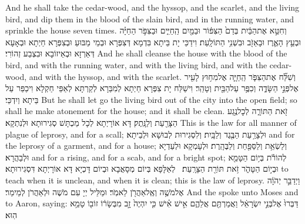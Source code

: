 {And he shall take the cedar-wood, and the hyssop, and the scarlet, and the living bird, and dip them in the blood of the slain bird, and in the running water, and sprinkle the house seven times.}{}
{וְחִטֵּ֣א אֶת\maqqaf הַבַּ֔יִת בְּדַם֙ הַצִּפּ֔וֹר וּבַמַּ֖יִם הַֽחַיִּ֑ים וּבַצִּפֹּ֣ר הַחַיָּ֗ה וּבְעֵ֥ץ הָאֶ֛רֶז וּבָאֵזֹ֖ב וּבִשְׁנִ֥י הַתּוֹלָֽעַת׃}
{וִידַכֵּי יָת בֵּיתָא בִּדְמָא דְּצִפְּרָא וּבְמֵי מַבּוּעַ וּבְצִפְּרָא חַיְתָא וּבְאָעָא דְּאַרְזָא וּבְאֵיזוֹבָא וּבִצְבַע זְהוֹרִי׃}
{And he shall cleanse the house with the blood of the bird, and with the running water, and with the living bird, and with the cedar-wood, and with the hyssop, and with the scarlet.}{}
{וְשִׁלַּ֞ח אֶת\maqqaf הַצִּפֹּ֧ר הַֽחַיָּ֛ה אֶל\maqqaf מִח֥וּץ לָעִ֖יר אֶל\maqqaf פְּנֵ֣י הַשָּׂדֶ֑ה וְכִפֶּ֥ר עַל\maqqaf הַבַּ֖יִת וְטָהֵֽר׃}
{וִישַׁלַּח יָת צִפְּרָא חַיְתָא לְמִבַּרָא לְקַרְתָּא לְאַפֵּי חַקְלָא וִיכַפַּר עַל בֵּיתָא וְיִדְכֵּי׃}
{But he shall let go the living bird out of the city into the open field; so shall he make atonement for the house; and it shall be clean.}{}
{זֹ֖את הַתּוֹרָ֑ה לְכׇל\maqqaf נֶ֥גַע הַצָּרַ֖עַת וְלַנָּֽתֶק׃}
{דָּא אוֹרָיְתָא לְכָל מַכְתָּשׁ סְגִירוּתָא וּלְנִתְקָא׃}
{This is the law for all manner of plague of leprosy, and for a scall;}{}
{וּלְצָרַ֥עַת הַבֶּ֖גֶד וְלַבָּֽיִת׃}
{וְלִסְגִירוּת לְבוּשָׁא וּלְבֵיתָא׃}
{and for the leprosy of a garment, and for a house;}{}
{וְלַשְׂאֵ֥ת וְלַסַּפַּ֖חַת וְלַבֶּהָֽרֶת׃}
{וּלְעָמְקָא וּלְעַדְיָא וּלְבַהֲרָא׃}
{and for a rising, and for a scab, and for a bright spot;}{}
{לְהוֹרֹ֕ת בְּי֥וֹם הַטָּמֵ֖א וּבְי֣וֹם הַטָּהֹ֑ר זֹ֥את תּוֹרַ֖ת הַצָּרָֽעַת׃ \petucha }
{לְאַלָּפָא בְּיוֹם מְסָאֲבָא וּבְיוֹם דָּכְיָא דָּא אוֹרָיְתָא דִּסְגִירוּתָא׃}
{to teach when it is unclean, and when it is clean; this is the law of leprosy.}{}
\newperek
{}
{וַיְדַבֵּ֣ר יְהֹוָ֔ה אֶל\maqqaf מֹשֶׁ֥ה וְאֶֽל\maqqaf אַהֲרֹ֖ן לֵאמֹֽר׃}
{וּמַלֵּיל יְיָ עִם מֹשֶׁה וּלְאַהֲרֹן לְמֵימַר׃}
{And the \lord\space spoke unto Moses and to Aaron, saying:}{}
{דַּבְּרוּ֙ אֶל\maqqaf בְּנֵ֣י יִשְׂרָאֵ֔ל וַאֲמַרְתֶּ֖ם אֲלֵהֶ֑ם אִ֣ישׁ אִ֗ישׁ כִּ֤י יִהְיֶה֙ זָ֣ב מִבְּשָׂר֔וֹ זוֹב֖וֹ טָמֵ֥א הֽוּא׃}
